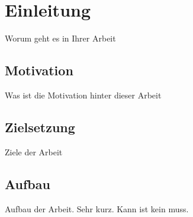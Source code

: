 \chapter{Einleitung}
\label{chap:einleitung}
Worum geht es in Ihrer Arbeit

\section{Motivation}
\label{sec:motivation}
Was ist die Motivation hinter dieser Arbeit

\section{Zielsetzung}
\label{sec:zielsetzung}
Ziele der Arbeit

\section{Aufbau}
\label{sec:aufbau}
Aufbau der Arbeit. Sehr kurz. Kann ist kein muss. 
